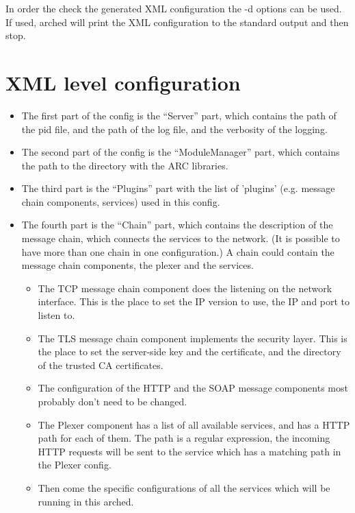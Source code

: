 \documentclass{article}
\begin{document}
In order the check the generated XML configuration the -d options can be used. If used, arched will  print the XML configuration to the standard output and then stop.


\section{XML level configuration}

\begin{itemize}
		\item The first part of the config is the “Server” part, which contains the path of the pid file, and the path of the log file, and the verbosity of the logging.
		\item The second part of the config is the “ModuleManager” part, which contains the path to the directory with the ARC libraries.
		\item The third part is the “Plugins” part with the list of 'plugins' (e.g. message chain components, services) used in this config.
		\item The fourth part is the “Chain” part, which contains the description of the message chain, which connects the services to the network. (It is possible to have more than one chain in one configuration.) A chain could contain the message chain components, the plexer and the services.
		\begin{itemize}
			\item The TCP message chain component does the listening on the network interface. This is the place to set the IP version to use, the IP and port to listen to.
			\item The TLS message chain component implements the security layer. This is the place to set the server-side key and the certificate, and the directory of the trusted CA certificates.
			\item The configuration of the HTTP and the SOAP message components most probably don't need to be changed.
			\item The Plexer component has a list of all available services, and has a HTTP path for each of them. The path is a regular expression, the incoming HTTP requests will be sent to the service which has a matching path in the Plexer config.
			\item Then come the specific configurations of all the services which will be running in this arched.
		\end{itemize}
\end{itemize}
\end{document}
